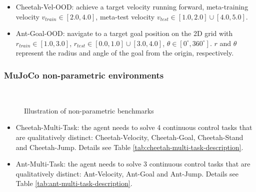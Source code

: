 \documentclass[letterpaper]{article} %
\begin{document}
\begin{itemize}
\item Cheetah-Vel-OOD: achieve a target velocity running forward, meta-training velocity $v_{train} \in [2.0, 4.0]$, meta-test velocity $v_{test} \in [1.0, 2.0] \cup [4.0, 5.0]$.
\item Ant-Goal-OOD: navigate to a target goal position on the 2D grid with $r_{train} \in [1.0, 3.0]$, $r_{test} \in [0.0, 1.0] \cup [3.0, 4.0]$, $\theta \in [0^{\circ}, 360^{\circ}]$. $r$ and $\theta$ represent the radius and angle of the goal from the origin, respectively. \par
\end{itemize}


\subsubsection{MuJoCo non-parametric environments} \par
\label{sec:mujoco-non-parametric-details}


\begin{figure}[t]
  \centering
    \\
  \caption{Illustration of non-parametric benchmarks}
	\label{fig:mujoco-task-illustration}
\end{figure}


\begin{itemize}
\item Cheetah-Multi-Task: the agent needs to solve 4 continuous control tasks that are qualitatively distinct: Cheetah-Velocity, Cheetah-Goal, Cheetah-Stand and Cheetah-Jump. Details see Table \ref{tab:cheetah-multi-task-description}.


\item Ant-Multi-Task: the agent needs to solve 3 continuous control tasks that are qualitatively distinct: Ant-Velocity, Ant-Goal and Ant-Jump. Details see Table \ref{tab:ant-multi-task-description}.
\end{itemize}

\end{document}
